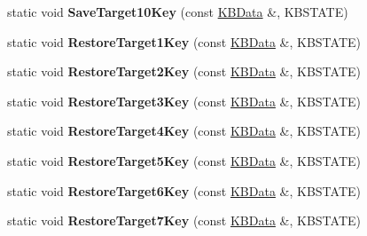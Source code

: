 \begin{DoxyCompactItemize}
\item 
static void {\bfseries Save\+Target10\+Key} (const \hyperlink{classKBData}{K\+B\+Data} \&, K\+B\+S\+T\+A\+TE)\hypertarget{classFireKeyboard_a88b5935a663c3bb3a42f1da341d4f647}{}\label{classFireKeyboard_a88b5935a663c3bb3a42f1da341d4f647}

\item 
static void {\bfseries Restore\+Target1\+Key} (const \hyperlink{classKBData}{K\+B\+Data} \&, K\+B\+S\+T\+A\+TE)\hypertarget{classFireKeyboard_a54a1cf442667b066f5c47c1659f71516}{}\label{classFireKeyboard_a54a1cf442667b066f5c47c1659f71516}

\item 
static void {\bfseries Restore\+Target2\+Key} (const \hyperlink{classKBData}{K\+B\+Data} \&, K\+B\+S\+T\+A\+TE)\hypertarget{classFireKeyboard_ad6dc400ce83c84732cb1fb4336506ce0}{}\label{classFireKeyboard_ad6dc400ce83c84732cb1fb4336506ce0}

\item 
static void {\bfseries Restore\+Target3\+Key} (const \hyperlink{classKBData}{K\+B\+Data} \&, K\+B\+S\+T\+A\+TE)\hypertarget{classFireKeyboard_a0f660c5c95eaeb601d7fe2b1b727ce76}{}\label{classFireKeyboard_a0f660c5c95eaeb601d7fe2b1b727ce76}

\item 
static void {\bfseries Restore\+Target4\+Key} (const \hyperlink{classKBData}{K\+B\+Data} \&, K\+B\+S\+T\+A\+TE)\hypertarget{classFireKeyboard_a2f77e4d54bcaed85fd1c63a1b2cd6762}{}\label{classFireKeyboard_a2f77e4d54bcaed85fd1c63a1b2cd6762}

\item 
static void {\bfseries Restore\+Target5\+Key} (const \hyperlink{classKBData}{K\+B\+Data} \&, K\+B\+S\+T\+A\+TE)\hypertarget{classFireKeyboard_a6ef34de294fb63ae2f6ff6308f8f36e5}{}\label{classFireKeyboard_a6ef34de294fb63ae2f6ff6308f8f36e5}

\item 
static void {\bfseries Restore\+Target6\+Key} (const \hyperlink{classKBData}{K\+B\+Data} \&, K\+B\+S\+T\+A\+TE)\hypertarget{classFireKeyboard_a7f4acc91d04f0af73309a5cb15131e99}{}\label{classFireKeyboard_a7f4acc91d04f0af73309a5cb15131e99}

\item 
static void {\bfseries Restore\+Target7\+Key} (const \hyperlink{classKBData}{K\+B\+Data} \&, K\+B\+S\+T\+A\+TE)\hypertarget{classFireKeyboard_a436181a0786f88413c10b0b0700a3b8e}{}\label{classFireKeyboard_a436181a0786f88413c10b0b0700a3b8e}


\end{DoxyCompactItemize}
